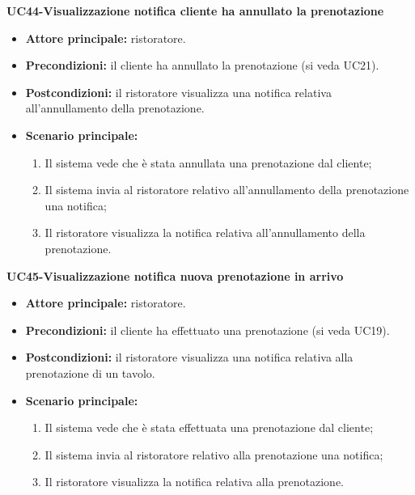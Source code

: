 \textbf{UC44-Visualizzazione notifica cliente ha annullato la prenotazione}
\begin{itemize}
\item \textbf{Attore principale:} ristoratore.
\item \textbf{Precondizioni:} il cliente ha annullato la prenotazione (si veda UC21).
\item \textbf{Postcondizioni:} il ristoratore visualizza una notifica relativa all'annullamento della prenotazione.
\item \textbf{Scenario principale:}
\begin{enumerate}
    \item Il sistema vede che è stata annullata una prenotazione dal cliente;
    \item Il sistema invia al ristoratore relativo all'annullamento della prenotazione una notifica;
    \item Il ristoratore visualizza la notifica relativa all'annullamento della prenotazione.
\end{enumerate}
\end{itemize}

\textbf{UC45-Visualizzazione notifica nuova prenotazione in arrivo}
\begin{itemize}
\item \textbf{Attore principale:} ristoratore.
\item \textbf{Precondizioni:} il cliente ha effettuato una prenotazione (si veda UC19).
\item \textbf{Postcondizioni:} il ristoratore visualizza una notifica relativa alla prenotazione di un tavolo.
\item \textbf{Scenario principale:}
\begin{enumerate}
    \item Il sistema vede che è stata effettuata una prenotazione dal cliente;
    \item Il sistema invia al ristoratore relativo alla prenotazione una notifica;
    \item Il ristoratore visualizza la notifica relativa alla prenotazione.
\end{enumerate}
\end{itemize}

